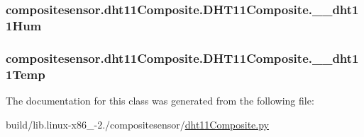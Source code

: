 \subsubsection[{\+\_\+\+\_\+dht11\+Hum}]{\setlength{\rightskip}{0pt plus 5cm}compositesensor.\+dht11\+Composite.\+D\+H\+T11\+Composite.\+\_\+\+\_\+dht11\+Hum\hspace{0.3cm}{\ttfamily [private]}}\label{classcompositesensor_1_1dht11Composite_1_1DHT11Composite_aea91e26405278f50d9726484b73d0b43}
\hypertarget{classcompositesensor_1_1dht11Composite_1_1DHT11Composite_a2bfbb5e7a204093ce856b80cd60df4b8}{}
\subsubsection[{\+\_\+\+\_\+dht11\+Temp}]{\setlength{\rightskip}{0pt plus 5cm}compositesensor.\+dht11\+Composite.\+D\+H\+T11\+Composite.\+\_\+\+\_\+dht11\+Temp\hspace{0.3cm}{\ttfamily [private]}}\label{classcompositesensor_1_1dht11Composite_1_1DHT11Composite_a2bfbb5e7a204093ce856b80cd60df4b8}


The documentation for this class was generated from the following file\+:\begin{DoxyCompactItemize}
\item 
build/lib.\+linux-\/x86\+\_-\/2./compositesensor/\hyperlink{build_2lib_8linux-x86__64-2_87_2compositesensor_2dht11Composite_8py}{dht11\+Composite.\+py}\end{DoxyCompactItemize}
